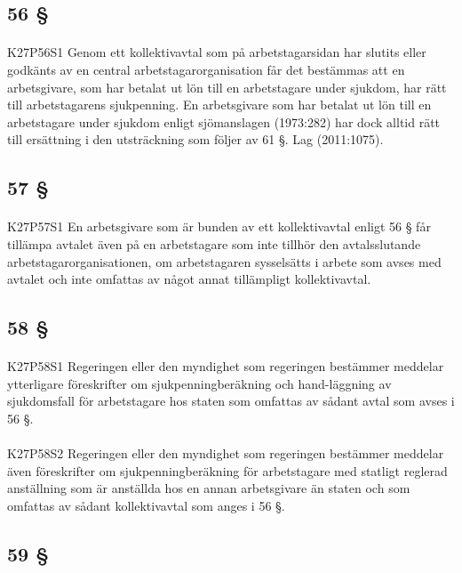 \documentclass[a4paper,notitlepage,openany,10pt]{book}
\begin{document}
\subsection*{56 §}
\paragraph*{}
{\tiny K27P56S1}
Genom ett kollektivavtal som på arbetstagarsidan har slutits eller godkänts av en central arbetstagarorganisation får det bestämmas att en arbetsgivare, som har betalat ut lön till en arbetstagare under sjukdom, har rätt till arbetstagarens sjukpenning. En arbetsgivare som har betalat ut lön till en arbetstagare under sjukdom enligt sjömanslagen (1973:282) har dock alltid rätt till ersättning i den utsträckning som följer av 61 §.
Lag (2011:1075).
\subsection*{57 §}
\paragraph*{}
{\tiny K27P57S1}
En arbetsgivare som är bunden av ett kollektivavtal enligt 56 § får tillämpa avtalet även på en arbetstagare som inte tillhör den avtalsslutande arbetstagarorganisationen, om arbetstagaren sysselsätts i arbete som avses med avtalet och inte omfattas av något annat tillämpligt kollektivavtal.
\subsection*{58 §}
\paragraph*{}
{\tiny K27P58S1}
Regeringen eller den myndighet som regeringen bestämmer meddelar ytterligare föreskrifter om sjukpenningberäkning och hand-läggning av sjukdomsfall för arbetstagare hos staten som omfattas av sådant avtal som avses i 56 §.
\paragraph*{}
{\tiny K27P58S2}
Regeringen eller den myndighet som regeringen bestämmer meddelar även föreskrifter om sjukpenningberäkning för arbetstagare med statligt reglerad anställning som är anställda hos en annan arbetsgivare än staten och som omfattas av sådant kollektivavtal som anges i 56 §.
\subsection*{59 §}
\end{document}

